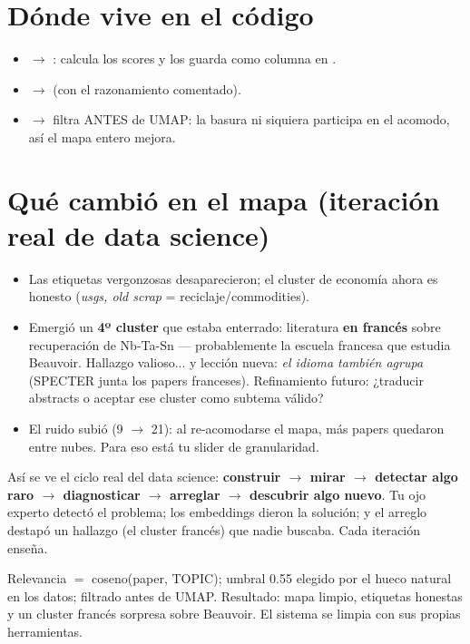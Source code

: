 \documentclass[11pt,a4paper]{article}
\begin{document}
\section{Dónde vive en el código}

\begin{itemize}
  \item {} $\rightarrow$ : calcula los scores y
        los guarda como columna  en .
  \item {} $\rightarrow$  (con el
        razonamiento comentado).
  \item {} $\rightarrow$ filtra ANTES de UMAP: la basura ni siquiera
        participa en el acomodo, así el mapa entero mejora.
\end{itemize}

\section{Qué cambió en el mapa (iteración real de data science)}

\begin{itemize}
  \item Las etiquetas vergonzosas desaparecieron; el cluster de economía ahora es honesto
        (\emph{usgs, old scrap} = reciclaje/commodities).
  \item Emergió un \textbf{4º cluster} que estaba enterrado: literatura \textbf{en francés}
        sobre recuperación de Nb-Ta-Sn --- probablemente la escuela francesa que estudia
        Beauvoir. Hallazgo valioso... y lección nueva: \emph{el idioma también agrupa}
        (SPECTER junta los papers franceses). Refinamiento futuro: ¿traducir abstracts o
        aceptar ese cluster como subtema válido?
  \item El ruido subió (9 $\rightarrow$ 21): al re-acomodarse el mapa, más papers quedaron
        entre nubes. Para eso está tu slider de granularidad.
\end{itemize}

\begin{ojo}
Así se ve el ciclo real del data science: \textbf{construir $\rightarrow$ mirar $\rightarrow$
detectar algo raro $\rightarrow$ diagnosticar $\rightarrow$ arreglar $\rightarrow$ descubrir
algo nuevo}. Tu ojo experto detectó el problema; los embeddings dieron la solución; y el
arreglo destapó un hallazgo (el cluster francés) que nadie buscaba. Cada iteración enseña.
\end{ojo}

\begin{resumen}
Relevancia $=$ coseno(paper, TOPIC); umbral 0.55 elegido por el hueco natural en los datos;
filtrado antes de UMAP. Resultado: mapa limpio, etiquetas honestas y un cluster francés
sorpresa sobre Beauvoir. El sistema se limpia con sus propias herramientas.
\end{resumen}
\end{document}
